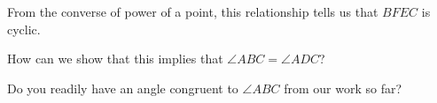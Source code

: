 



From the converse of power of a point, this relationship tells us that $BFEC$ is cyclic.

How can we show that this implies that $\angle ABC = \angle ADC$?

Do you readily have an angle congruent to $\angle ABC$ from our work so far?















